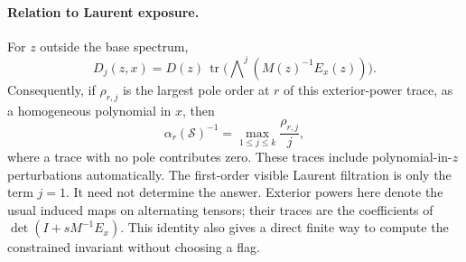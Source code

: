 \paragraph{Relation to Laurent exposure.}
For $z$ outside the base spectrum,
\[
 D_j(z,x)=D(z)\,
           \operatorname{tr}\bigl(\mathop{\bigwedge}\nolimits^j
                                  (M(z)^{-1}E_x(z))\bigr).
\]
Consequently, if $\rho_{r,j}$ is the largest pole order at $r$ of
this exterior-power trace, as a homogeneous polynomial in $x$, then
\[
 \alpha_r(\mathcal S)^{-1}
       =\max_{1\le j\le k}\frac{\rho_{r,j}}j,
\]
where a trace with no pole contributes zero. These traces include
polynomial-in-$z$ perturbations automatically. The first-order
visible Laurent filtration is only the term $j=1$. It need not
determine the answer. Exterior powers here denote the usual induced
maps on alternating tensors; their traces are the coefficients of
$\det(I+sM^{-1}E_x)$. This identity also gives a direct finite way
to compute the constrained invariant without choosing a flag.

